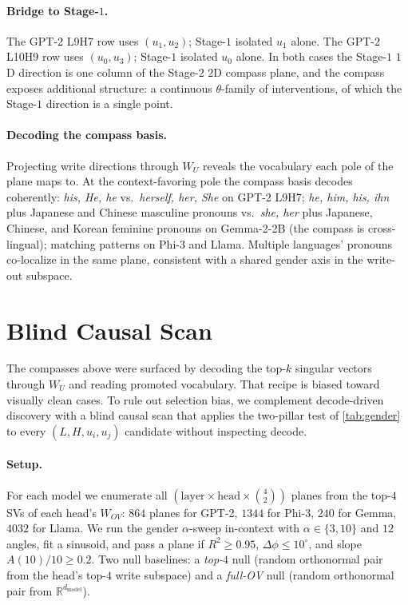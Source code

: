 \paragraph{Bridge to Stage-$1$.} The GPT-2 L9H7 row uses
$(u_1, u_2)$; Stage-$1$ isolated $u_1$ alone. The GPT-2 L10H9 row
uses $(u_0, u_3)$; Stage-$1$ isolated $u_0$ alone. In both cases
the Stage-$1$ $1$D direction is one column of the Stage-$2$ $2$D
compass plane, and the compass exposes additional structure: a
continuous $\theta$-family of interventions, of which the
Stage-$1$ direction is a single point.

\paragraph{Decoding the compass basis.} Projecting write
directions through $W_U$ reveals the vocabulary each pole of the
plane maps to. At the context-favoring pole the compass basis
decodes coherently: \emph{his, He, he} vs.\ \emph{herself, her,
She} on GPT-2 L9H7; \emph{he, him, his, ihn} plus Japanese and
Chinese masculine pronouns vs.\ \emph{she, her} plus Japanese,
Chinese, and Korean feminine pronouns on Gemma-2-2B (the compass
is cross-lingual); matching patterns on Phi-3 and Llama. Multiple
languages' pronouns co-localize in the same plane, consistent
with a shared gender axis in the write-out subspace.

\section{Blind Causal Scan}
\label{sec:scan}

The compasses above were surfaced by decoding the top-$k$ singular
vectors through $W_U$ and reading promoted vocabulary. That recipe
is biased toward visually clean cases. To rule out selection bias,
we complement decode-driven discovery with a blind causal scan
that applies the two-pillar test of \cref{tab:gender} to every
$(L, H, u_i, u_j)$ candidate without inspecting decode.

\paragraph{Setup.} For each model we enumerate all
$(\text{layer} \times \text{head} \times \binom{4}{2})$ planes from
the top-$4$ SVs of each head's $W_{OV}$: $864$ planes for GPT-2,
$1344$ for Phi-3, $240$ for Gemma, $4032$ for Llama. We run the
gender $\alpha$-sweep in-context with $\alpha \in \{3, 10\}$ and
$12$ angles, fit a sinusoid, and pass a plane if $R^2 \ge 0.95$,
$\Delta\phi \le 10^\circ$, and slope $A(10)/10 \ge 0.2$. Two null
baselines: a \emph{top-$4$} null (random orthonormal pair from the
head's top-$4$ write subspace) and a \emph{full-OV} null (random
orthonormal pair from $\mathbb{R}^{d_{\text{model}}}$).

